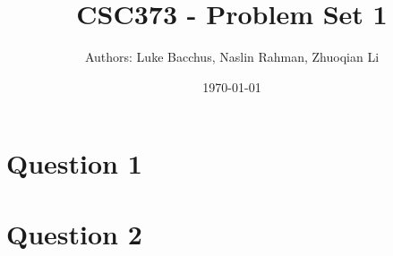\documentclass[12pt]{article}
\title{CSC373 - Problem Set 1}
\author{Authors: Luke Bacchus, Naslin Rahman, Zhuoqian Li}
\date{\today}
\begin{document}
\maketitle

\section*{Question 1}

\newpage

\section*{Question 2}
\end{document}
